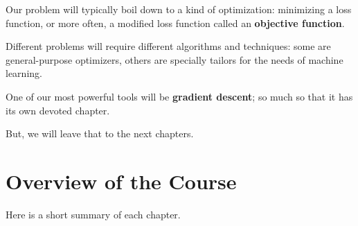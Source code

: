     Our problem will typically boil down to a kind of optimization: minimizing a loss function, or more often, a modified loss function called an \textbf{objective function}.
    
    Different problems will require different algorithms and techniques: some are general-purpose optimizers, others are specially tailors for the needs of machine learning.
    
    One of our most powerful tools will be \textbf{gradient descent}; so much so that it has its own devoted chapter.
    
    But, we will leave that to the next chapters.


\pagebreak

\section{Overview of the Course}

    Here is a short summary of each chapter.
    

